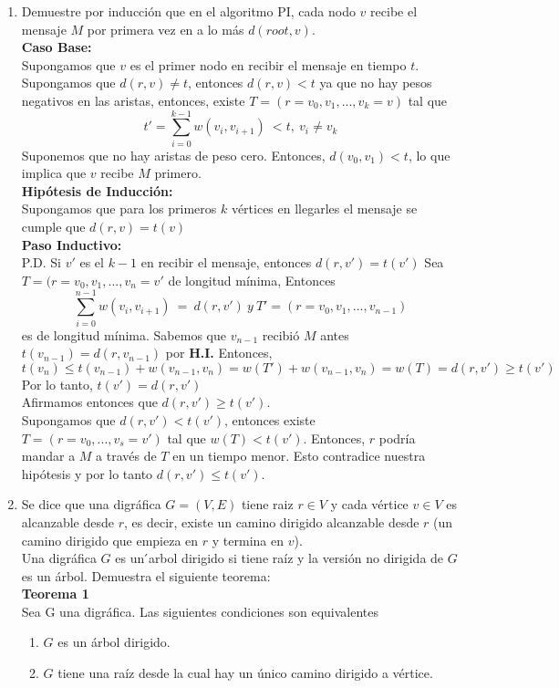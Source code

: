 \documentclass[12pt,a4paper]{report}
\begin{document}
\begin{enumerate}
		\item{
			Demuestre por inducción que en el algoritmo PI, cada nodo $v$ recibe el
			mensaje $M$ por primera vez en a lo más $d(root, v)$.\\

			\textbf{Caso Base: }\\
			Supongamos que $v$ es el primer nodo en recibir el mensaje en tiempo $t$.\\
			Supongamos que $d(r,v)\neq t$, entonces $d(r,v) < t$ ya que no hay pesos
			negativos en las aristas, entonces, existe $T=(r=v_0,v_1,...,v_k=v)$ tal que
			\[t'= \sum_{i=0}^{k-1} w(v_i,v_{i+1})\  <t,\ v_i\neq v_k\]
			Suponemos que no hay aristas de peso cero. Entonces, $d(v_0,v_1)<t$,
			lo que implica que $v$ recibe $M$ primero.\\
			\textbf{Hipótesis de Inducción:}\\
			Supongamos que para los primeros $k$ vértices en llegarles el mensaje
			se cumple que $d(r,v)=t(v)$\\
			\textbf{Paso Inductivo: }\\
			P.D. Si $v'$ es el $k-1$ en recibir el mensaje, entonces $d(r,v') = t(v')$
			Sea $T=(r=v_0,v_1,...,v_n=v'$ de longitud mínima, Entonces
			\[\sum_{i=0}^{n-1}w(v_i,v_{i+1})\ =\ d(r,v')\ y \ T'= (r=v_0,v_1,...,v_{n-1})\]
			es de longitud mínima.
			Sabemos que $v_{n-1}$ recibió $M$ antes $t(v_{n-1})=d(r,v_{n-1})$ por \textbf{H.I.}
			Entonces,
			\[t(v_n) \leq t(v_{n-1})+w(v_{n-1},v_n)=w(T')+w(v_{n-1},v_n)=w(T)=d(r,v')
				\geq t(v')\]
			Por lo tanto, $t(v')=d(r,v')$\\
			Afirmamos entonces que $d(r,v')\geq t(v')$.\\
			Supongamos que $d(r,v')<t(v')$, entonces existe $T=(r=v_0,...,v_s=v')$
			tal que $w(T)<t(v')$. Entonces, $r$ podría mandar a $M$ a través de $T$
			en un tiempo menor. Esto contradice nuestra hipótesis y por lo tanto
			$d(r,v')\leq t(v')$.
		}
		\item{
			Se dice que una digráfica $G = (V, E)$ tiene raiz $r \in V$ y cada
			vértice $v \in V$ es alcanzable desde $r$, es decir, existe un camino
			dirigido alcanzable desde $r$ (un camino dirigido que empieza en $r$ y
			termina en $v$).\\
			Una digráfica $G$ es un  ́arbol dirigido si tiene raíz y la versión no dirigida
			de $G$ es un árbol. Demuestra el siguiente teorema:\\

			\textbf{Teorema 1}\\
			Sea G una digráfica. Las siguientes condiciones son equivalentes
			\begin{enumerate} [label = \alph*)]
				\item {
					$G$ es un árbol dirigido.\\
				}
				\item {
					$G$ tiene una raíz desde la cual hay un único camino dirigido a
					vértice.\\
				}


\end{enumerate}}
\end{enumerate}
\end{document}
